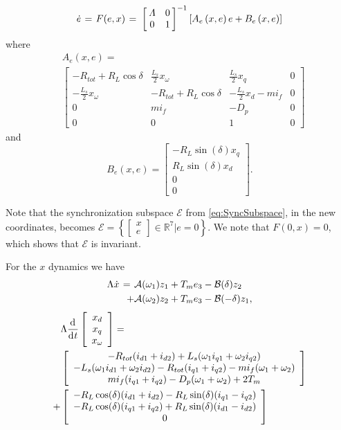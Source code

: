 \documentclass[letterpaper, 10 pt, conference]{ieeeconf}
\renewcommand{\o}    {{\omega}}
\newcommand{\m}      {{\hbox{\hskip 1pt}}}
\newcommand{\nm}     {{\hbox{\hskip -3pt}}}
\newcommand{\dd}     {{\rm d\hbox{\hskip 0.5pt}}}
\newcommand{\Amscr}  {{\mathcal{A}}}
\newcommand{\Bmscr}  {{\mathcal{B}}}
\begin{document}
$$ \dot{e} \m=\m F(e,x) \m=\m \left[\nm\begin{array}{cc} \varLambda 
   & 0\\ 0 & 1 \end{array}\nm\right]^{-1} \left[A_e\left(x,e\right) 
   e + B_e \left(x,e\right) \right]$$
where 
$$ \begin{aligned}
&A_e\left(x,e\right)  = \\ & \left[\begin{array}{cccc}
-R_{tot}+R_{L}\cos\delta & \frac{L_{s}}{2}x_{\omega} & \frac{L_{s}}{2}x_{q} & 0\\
-\frac{L_{s}}{2}x_{\omega} & -R_{tot}+R_{L}\cos\delta & -\frac{L_{s}}{2}x_{d}-mi_f & 0\\
0 & mi_{f} & -D_{p} & 0\\
0 & 0 & 1 & 0
\end{array}\right]
\end{aligned}
$$ 
and
$$
B_e\left(x,e\right) = 
\left[\begin{array}{c}
-R_{L}\sin(\delta)x_{q}\\
R_{L}\sin(\delta)x_{d}\\
0\\
0
\end{array}\right].
$$

Note that the synchronization subspace $\mathscr{E}$ from \eqref{eq:SyncSubspace}, in the new coordinates, becomes $\mathscr{E}=\left\{\left[ \begin{array}{c}
x \\
e
\end{array}\right] \in\mathbb{R}^{7}|e=0 \right\}$.
We note that $F(0,x)=0$, which shows that 
$\mathscr{E} $ is invariant.

For the $x$ dynamics we have
$$ \begin{aligned} \Lambda\dot{x} \m=\m & \Amscr(\o_1) z_1 + T_m e_3
   -\Bmscr(\delta) z_2\\ +& \Amscr(\o_2) z_2 + T_m e_3-\Bmscr
   (-\delta) z_1, \end{aligned}$$
$$ \begin{aligned} &\Lambda\frac{\dd}{\dd t}\left[\begin{array}{c}
   x_{d}\\ x_{q}\\ x_{\o} \end{array}\right] = \\
   & \left[\begin{array}{c} - R_{tot}(i_{d1}+i_{d2})+L_s(\o_1 i_{q1}
   +\o_2 i_{q2})\\ -L_s(\o_1 i_{d1}+\o_2 i_{d2})-R_{tot}(i_{q1} +
   i_{q2})-m i_f(\o_1+\o_2)\\ m i_f(i_{q1}+i_{q2})-D_p(\o_1+\o_2) +
   2T_m \end{array}\right]\\ +& \left[ \begin{array}{c}
   -R_L\cos(\delta)(i_{d1}+i_{d2})-R_L\sin(\delta)(i_{q1}-i_{q2})\\
   -R_L\cos(\delta)(i_{q1}+i_{q2})+R_L\sin(\delta)(i_{d1}-i_{d2})\\
   0 \end{array}\right] \end{aligned}$$
\end{document}
